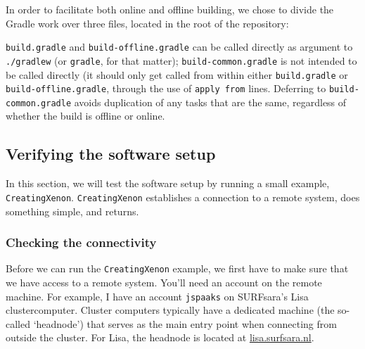 \documentclass[12pt, a4paper, twoside,openany,titlepage]{article}
\begin{document}
In order to facilitate both online and offline building, we chose to divide the Gradle work over three files, located in the root of the repository:
\begin{enumerate}
\item{\texttt{build.gradle} }
\item{\texttt{build-offline.gradle}} }
\item{\texttt{build-common.gradle}} \index{Xenon!Gradle!build-common.gradle@\texttt{build-common.gradle}}}
\end{enumerate}

\texttt{build.gradle} and \texttt{build-offline.gradle} can be called directly as argument to \texttt{./gradlew} (or \texttt{gradle}, for that matter); \texttt{build-common.gradle} is not intended to be called directly (it should only get called from within either \texttt{build.gradle} or \texttt{build-offline.gradle}, through the use of \texttt{apply from} lines. Deferring to \texttt{build-common.gradle} avoids duplication of any tasks that are the same, regardless of whether the build is offline or online.


\subsection{Verifying the software setup}


In this section, we will test the software setup by running a small example, \texttt{CreatingXenon}. \texttt{CreatingXenon} establishes a connection to a remote system, does something simple, and returns.

\subsubsection{Checking the connectivity}

Before we can run the \texttt{CreatingXenon} example, we first have to make sure that we have access to a remote system. You'll need an account on the remote machine. For example, I have an account \texttt{jspaaks} on SURFsara's Lisa clustercomputer. Cluster computers typically have a dedicated machine (the so-called `headnode') that serves as the main entry point when connecting from outside the cluster. For Lisa, the headnode is located at \url{lisa.surfsara.nl}.
\end{document}

